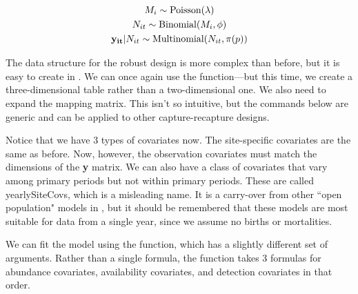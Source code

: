 \documentclass[a4paper]{article}
\renewenvironment{Schunk}{\vspace{\topsep}}{\vspace{\topsep}}
\begin{document}
\begin{gather}
  M_i \sim \mbox{Poisson}(\lambda) \nonumber \\
  N_{it} \sim \mbox{Binomial}(M_i, \phi) \\
  {\bf y_{it}}|N_{it} \sim \mbox{Multinomial}(N_{it}, \pi(p))
  \label{mod:te}
\end{gather}


The data structure for the robust design is more complex than before,
but it is easy to create in . We can once again use the
 function---but this time, we create a three-dimensional table
rather than a two-dimensional one. We also need to expand the
 mapping matrix. This isn't so intuitive, but the
commands below are generic and can be applied to other
capture-recapture designs.

\begin{Schunk}
\end{Schunk}


Notice that we have 3 types of covariates now. The site-specific
covariates are the same as before. Now, however, the observation
covariates must match the dimensions of the {\bf y} matrix. We can
also have a class of covariates that vary among primary periods but
not within primary periods. These are called yearlySiteCovs, which is
a misleading name. It is a carry-over from other ``open population"
models in , but it should be remembered that these
models are most suitable for data from a single year, since we assume
no births or mortalities.

We can fit the model using the  function, which has a
slightly different set of arguments. Rather than a single formula, the
function takes 3 formulas for abundance covariates, availability
covariates, and detection covariates in that order.
\end{document}
